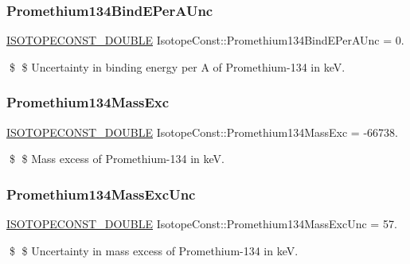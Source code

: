 \subsubsection{\texorpdfstring{Promethium134\+Bind\+E\+Per\+A\+Unc}{Promethium134BindEPerAUnc}}
{\footnotesize\ttfamily \mbox{\hyperlink{group___isotope_const-_macros_ga8f45a7272ce02c0b4c65c44636ed719a}{I\+S\+O\+T\+O\+P\+E\+C\+O\+N\+S\+T\+\_\+\+D\+O\+U\+B\+LE}} Isotope\+Const\+::\+Promethium134\+Bind\+E\+Per\+A\+Unc = 0.}

\$ \$ Uncertainty in binding energy per A of Promethium-\/134 in keV. \mbox{\label{group___isotope_const-_promethium-_pm134_gab2fb5fc0dc3c6dde9aa07d671d882900}} 
\subsubsection{\texorpdfstring{Promethium134\+Mass\+Exc}{Promethium134MassExc}}
{\footnotesize\ttfamily \mbox{\hyperlink{group___isotope_const-_macros_ga8f45a7272ce02c0b4c65c44636ed719a}{I\+S\+O\+T\+O\+P\+E\+C\+O\+N\+S\+T\+\_\+\+D\+O\+U\+B\+LE}} Isotope\+Const\+::\+Promethium134\+Mass\+Exc = -\/66738.}

\$ \$ Mass excess of Promethium-\/134 in keV. \mbox{\label{group___isotope_const-_promethium-_pm134_gad77dc293c376a79c5531384ff37d4bea}} 
\subsubsection{\texorpdfstring{Promethium134\+Mass\+Exc\+Unc}{Promethium134MassExcUnc}}
{\footnotesize\ttfamily \mbox{\hyperlink{group___isotope_const-_macros_ga8f45a7272ce02c0b4c65c44636ed719a}{I\+S\+O\+T\+O\+P\+E\+C\+O\+N\+S\+T\+\_\+\+D\+O\+U\+B\+LE}} Isotope\+Const\+::\+Promethium134\+Mass\+Exc\+Unc = 57.}

\$ \$ Uncertainty in mass excess of Promethium-\/134 in keV. \mbox{\label{group___isotope_const-_promethium-_pm134_ga8b475bcab6363b5681cfc2ffe3749ce9}} 
